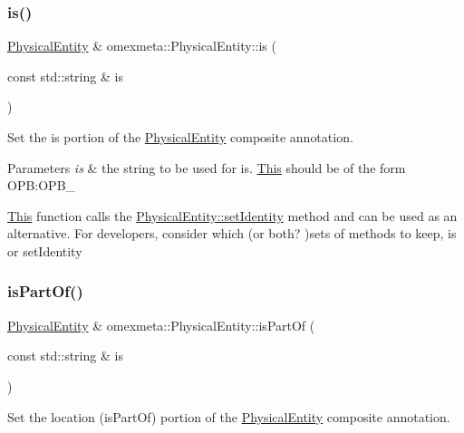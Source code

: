 \subsubsection{\texorpdfstring{is()}{is()}}
{\footnotesize\ttfamily \hyperlink{classomexmeta_1_1PhysicalEntity}{Physical\+Entity} \& omexmeta\+::\+Physical\+Entity\+::is (\begin{DoxyParamCaption}\item[{const std\+::string \&}]{is }\end{DoxyParamCaption})}



Set the {\ttfamily is} portion of the \hyperlink{classomexmeta_1_1PhysicalEntity}{Physical\+Entity} composite annotation. 


\begin{DoxyParams}{Parameters}
{\em is} & the string to be used for is. \hyperlink{classThis}{This} should be of the form O\+PB\+:O\+P\+B\+\_\\
\hline
\end{DoxyParams}
\hyperlink{classThis}{This} function calls the {\ttfamily \hyperlink{classomexmeta_1_1PhysicalEntity_a4d4c3ee9572b19e44e79a44f18f1ac31}{Physical\+Entity\+::set\+Identity}} method and can be used as an alternative. For developers, consider which (or both? )sets of methods to keep, {\ttfamily is} or {\ttfamily set\+Identity} \mbox{\label{classomexmeta_1_1PhysicalEntity_a6a68c098a063d5a8416b83ae219eddca}} 
\subsubsection{\texorpdfstring{is\+Part\+Of()}{isPartOf()}}
{\footnotesize\ttfamily \hyperlink{classomexmeta_1_1PhysicalEntity}{Physical\+Entity} \& omexmeta\+::\+Physical\+Entity\+::is\+Part\+Of (\begin{DoxyParamCaption}\item[{const std\+::string \&}]{is }\end{DoxyParamCaption})}



Set the location ({\ttfamily is\+Part\+Of}) portion of the \hyperlink{classomexmeta_1_1PhysicalEntity}{Physical\+Entity} composite annotation. 



